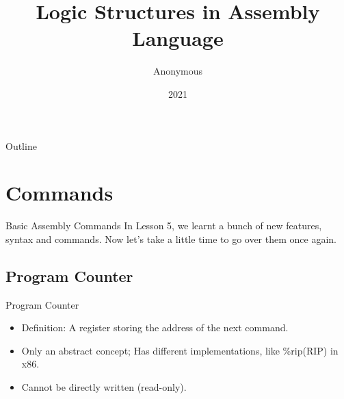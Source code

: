 \documentclass{beamer}
\title{Logic Structures in Assembly Language}
\author{Anonymous}
\institute{Peking University}
\date{2021}
\newtheorem{rmk}{Remark}
\begin{document}
    \frame{\titlepage}
    \begin{frame}{Outline}
        \tableofcontents
    \end{frame}

    \section{Commands}
    \begin{frame}{Basic Assembly Commands}
        In Lesson 5, we learnt a bunch of new features, syntax and commands. Now let's take a little time to go over them once again.
    \end{frame}
        \subsection{Program Counter}
        \begin{frame}{Program Counter}
            \begin{itemize}
                \item Definition: A register storing the address of the next command.
                \item<2-> Only an \alert<2->{abstract concept}; Has different implementations, like \%rip(RIP) in x86.
                \item<3-> Cannot be directly written (read-only).
            \end{itemize}
        \end{frame}
\end{document}
